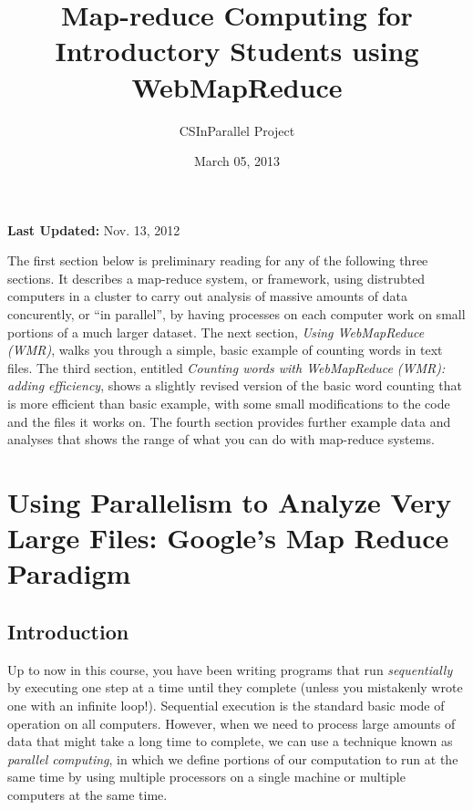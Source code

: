 \documentclass[letterpaper,10pt,openany,oneside]{sphinxmanual}
\title{Map-reduce Computing for Introductory Students using WebMapReduce}
\date{March 05, 2013}
\author{CSInParallel Project}
\begin{document}
\maketitle
\tableofcontents
{}\label{index::doc}


\textbf{Last Updated:} Nov. 13, 2012

The first section below is preliminary reading for any of the following three sections.
It describes a map-reduce system, or framework, using distrubted computers in a cluster
to carry out analysis of massive amounts of data concurently, or ``in parallel'', by having
processes on each computer work on small portions of a much larger dataset.
The next section, \emph{Using WebMapReduce (WMR)}, walks you through a simple, basic example of
counting words in text files.  The third section, entitled
\emph{Counting words with WebMapReduce (WMR): adding efficiency}, shows a slightly revised version
of the basic word counting that is more efficient than basic example, with some small modifications
to the code and the files it works on.  The fourth section provides further example
data and analyses that shows the range of what you can do with map-reduce systems.


\chapter{Using Parallelism to Analyze Very Large Files: Google's Map Reduce Paradigm}
\label{MapReduceIntro/MapReduceIntro:map-reduce-computing-for-introductory-students-using-webmapreduce}\label{MapReduceIntro/MapReduceIntro::doc}\label{MapReduceIntro/MapReduceIntro:using-parallelism-to-analyze-very-large-files-google-s-map-reduce-paradigm}

\section{Introduction}
\label{MapReduceIntro/MapReduceIntro:introduction}
Up to now in this course, you have been writing programs that run
\emph{sequentially} by executing one step at a time until they complete
(unless you mistakenly wrote one with an infinite loop!).
Sequential execution is the standard basic mode of operation on all
computers. However, when we need to process large amounts of data
that might take a long time to complete, we can use a technique
known as \emph{parallel computing}, in which we define portions of our
computation to run at the same time by using multiple processors on
a single machine or multiple computers at the same time.
\end{document}
